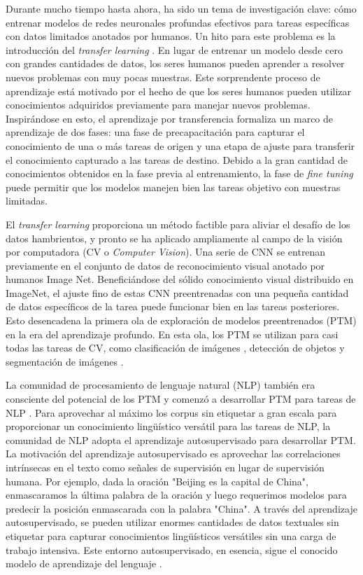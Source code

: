 Durante mucho tiempo hasta ahora, ha sido un tema de investigación clave: cómo entrenar modelos de redes neuronales profundas efectivos para tareas específicas con datos limitados anotados por humanos. Un hito para este problema es la introducción del \textit{transfer learning} \parencite{9, 10}. En lugar de entrenar un modelo desde cero con grandes cantidades de datos, los seres humanos pueden aprender a resolver nuevos problemas con muy pocas muestras. Este sorprendente proceso de aprendizaje está motivado por el hecho de que los seres humanos pueden utilizar conocimientos adquiridos previamente para manejar nuevos problemas. Inspirándose en esto, el aprendizaje por transferencia formaliza un marco de aprendizaje de dos fases: una fase de precapacitación para capturar el conocimiento de una o más tareas de origen y una etapa de ajuste para transferir el conocimiento capturado a las tareas de destino. Debido a la gran cantidad de conocimientos obtenidos en la fase previa al entrenamiento, la fase de \textit{fine tuning} puede permitir que los modelos manejen bien las tareas objetivo con muestras limitadas.  

El \textit{transfer learning} proporciona un método factible para aliviar el desafío de los datos hambrientos, y pronto se ha aplicado ampliamente al campo de la visión por computadora (CV o \textit{Computer Vision}). Una serie de CNN \parencite{78} \parencite{79} \parencite{80} se entrenan previamente en el conjunto de datos de reconocimiento visual anotado por humanos Image Net. Beneficiándose del sólido conocimiento visual distribuido en ImageNet, el ajuste fino de estas CNN preentrenadas con una pequeña cantidad de datos específicos de la tarea puede funcionar bien en las tareas posteriores. Esto desencadena la primera ola de exploración de modelos preentrenados (PTM) en la era del aprendizaje profundo. En esta ola, los PTM se utilizan para casi todas las tareas de CV, como clasificación de imágenes \parencite{81}, detección de objetos \parencite{82} y segmentación de imágenes \parencite{83}.  

La comunidad de procesamiento de lenguaje natural (NLP) también era consciente del potencial de los PTM y comenzó a desarrollar PTM para tareas de NLP \parencite{84}. Para aprovechar al máximo los corpus sin etiquetar a gran escala para proporcionar un conocimiento lingüístico versátil para las tareas de NLP, la comunidad de NLP adopta el aprendizaje autosupervisado \parencite{85} para desarrollar PTM. La motivación del aprendizaje autosupervisado es aprovechar las correlaciones intrínsecas en el texto como señales de supervisión en lugar de supervisión humana. Por ejemplo, dada la oración "Beijing es la capital de China", enmascaramos la última palabra de la oración y luego requerimos modelos para predecir la posición enmascarada con la palabra "China". A través del aprendizaje autosupervisado, se pueden utilizar enormes cantidades de datos textuales sin etiquetar para capturar conocimientos lingüísticos versátiles sin una carga de trabajo intensiva. Este entorno autosupervisado, en esencia, sigue el conocido modelo de aprendizaje del lenguaje \parencite{86}.  

